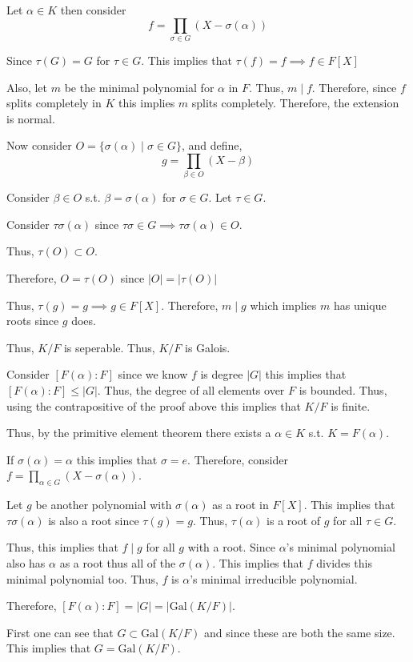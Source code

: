 \documentclass[12pt, letterpaper]{article}
\renewcommand{\t}[1]{\text{#1}}
\begin{document}
\begin{problemproof}
    Let $\alpha \in K$ then consider
    \[f=\prod_{\sigma \in G} (X-\sigma(\alpha))\]

    Since $\tau(G)=G$ for $\tau \in G$. This implies that $\tau(f)=f \implies f \in F[X]$

    Also, let $m$ be the minimal polynomial for $\alpha$ in $F$. Thus, $m \mid f$. Therefore, since $f$ splits completely in $K$ this implies $m$ splits completely. Therefore, the extension is normal.

    Now consider $O=\{\sigma(\alpha) \mid \sigma \in G\}$, and define,
    \[g=\prod_{\beta \in O}(X-\beta)\]
    
    Consider $\beta \in O$ s.t. $\beta=\sigma(\alpha)$ for $\sigma \in G$. Let $\tau \in G$.

    Consider $\tau\sigma(\alpha)$ since $\tau\sigma \in G \implies \tau\sigma(\alpha) \in O$.

    Thus, $\tau(O) \subset O$.

    Therefore, $O=\tau(O)$ since $|O|=|\tau(O)|$

    Thus, $\tau(g)=g \implies g \in F[X]$. Therefore, $m \mid g$ which implies $m$ has unique roots since $g$ does.

    Thus, $K/F$ is seperable. Thus, $K/F$ is Galois.

    Consider $[F(\alpha):F]$ since we know $f$ is degree $|G|$ this implies that $[F(\alpha):F] \leq |G|$. Thus, the degree of all elements over $F$ is bounded. Thus, using the contrapositive of the proof above this implies that $K/F$ is finite.

    Thus, by the primitive element theorem there exists a $\alpha \in K$ s.t. $K=F(\alpha)$.

    If $\sigma(\alpha)=\alpha$ this implies that $\sigma = e$. Therefore, consider $f=\prod_{\alpha \in G}(X-\sigma(\alpha))$.

    Let $g$ be another polynomial with $\sigma(\alpha)$ as a root in $F[X]$. This implies that $\tau\sigma(\alpha)$ is also a root since $\tau(g)=g$. Thus, $\tau(\alpha)$ is a root of $g$ for all $\tau \in G$.

    Thus, this implies that $f \mid g$ for all $g$ with a root. Since $\alpha$'s minimal polynomial also has $\alpha$ as a root thus all of the $\sigma(\alpha)$. This implies that $f$ divides this minimal polynomial too. Thus, $f$ is $\alpha$'s minimal irreducible polynomial.

    Therefore, $[F(\alpha):F]=|G|=|\t{Gal}(K/F)|$.

    First one can see that $G \subset \t{Gal}(K/F)$ and since these are both the same size. This implies that $G=\t{Gal}(K/F)$.
\end{problemproof}
\end{document}
